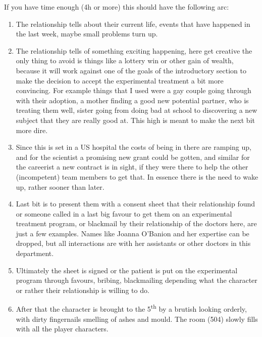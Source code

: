 \documentclass[bg-full]{resources/stylesheets/kult}
\begin{document}
If you have time enough (4h or more) this should have the following arc:
\begin{enumerate}
  \item The relationship tells about their current life, events that have happened in the last week, maybe small problems turn up.

  \item The relationship tells of something exciting happening, here get creative the only thing to avoid is things like a
        lottery win or other gain of wealth, because it will work against one of the goals of the introductory section to make the
        decision to accept the experimental treatment a bit more convincing.  For example things that I used were a gay couple going
        through with their adoption, a mother finding a good new potential partner, who is treating them well, sister going from doing
        bad at school to discovering a new subject that they are really good at.  This high is meant to make the next bit more dire.

  \item Since this is set in a US hospital the costs of being in there are ramping up, and for the scientist a promising new
        grant could be gotten, and similar for the careerist a new contract is in sight, if they were there to help the other
        (incompetent) team members to get that.  In essence there is the need to wake up, rather sooner than later.

  \item Last bit is to present them with a consent sheet that their relationship found or someone called in a last big favour
        to get them on an experimental treatment program, or blackmail by their relationship of the doctors here, are just a few
        examples.  Names like Joanna O'Banion and her expertise can be dropped, but all interactions are
        with her assistants or other doctors in this department.

  \item Ultimately the sheet is signed or the patient is put on the experimental program through favours, bribing, blackmailing
        depending what the character or rather their relationship is willing to do.

  \item After that the character is brought to the 5\textsuperscript{th} by a brutish looking orderly, with dirty fingernails
        smelling of ashes and mould.  The room (504) slowly fills with all the player characters.
\end{enumerate}
\end{document}
